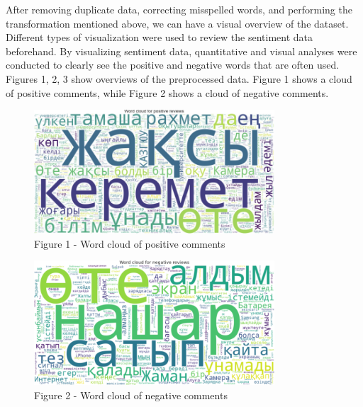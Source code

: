 \begin{multicols}{2}
After removing duplicate data, correcting misspelled words, and
performing the transformation mentioned above, we can have a visual
overview of the dataset. Different types of visualization were used to
review the sentiment data beforehand. By visualizing sentiment data,
quantitative and visual analyses were conducted to clearly see the
positive and negative words that are often used. Figures 1, 2, 3 show
overviews of the preprocessed data. Figure 1 shows a cloud of positive
comments, while Figure 2 shows a cloud of negative comments.
\end{multicols}

\begin{figure}[H]
	\centering
	\includegraphics[width=0.8\textwidth]{media/ict/image9}
	\caption*{Figure 1 - Word cloud of positive comments}
\end{figure}

\begin{figure}[H]
	\centering
	\includegraphics[width=0.8\textwidth]{media/ict/image10}
	\caption*{Figure 2 - Word cloud of negative comments}
\end{figure}

